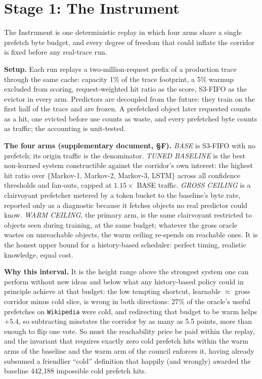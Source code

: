 \documentclass[letterpaper]{article} %
\begin{document}
\section{Stage 1: The Instrument}
The Instrument is one deterministic replay in which four arms share a single prefetch byte budget, and every degree of freedom that could inflate the corridor is fixed before any real-trace run.

\textbf{Setup.} Each run replays a two-million-request prefix of a production trace through the same cache: capacity 1\% of the trace footprint, a 5\% warmup excluded from scoring, request-weighted hit ratio as the score, S3-FIFO as the evictor in every arm. Predictors are decoupled from the future: they train on the first half of the trace and are frozen. A prefetched object later requested counts as a hit, one evicted before use counts as waste, and every prefetched byte counts as traffic; the accounting is unit-tested.

\textbf{The four arms (supplementary document, \S F).} \emph{BASE} is S3-FIFO with no prefetch; its origin traffic is the denominator. \emph{TUNED BASELINE} is the best non-learned system constructible against the corridor's own interest: the highest hit ratio over $\{$Markov-1, Markov-2, Markov-3, LSTM$\}$ across all confidence thresholds and fan-outs, capped at $1.15\times$ BASE traffic. \emph{GROSS CEILING} is a clairvoyant prefetcher metered by a token bucket to the baseline's byte rate, reported only as a diagnostic because it fetches objects no real predictor could know. \emph{WARM CEILING}, the primary arm, is the same clairvoyant restricted to objects seen during training, at the same budget; whatever the gross oracle wastes on unreachable objects, the warm ceiling re-spends on reachable ones. It is the honest upper bound for a history-based scheduler: perfect timing, realistic knowledge, equal cost.

\textbf{Why this interval.} It is the height range above the strongest system one can perform without new ideas and below what any history-based policy could in principle achieve at that budget: the low tempting shortcut, learnable $\approx$ gross corridor minus cold slice, is wrong in both directions: 27\% of the oracle's useful prefetches on \texttt{Wikipedia} were cold, and redirecting that budget to be warm helps $+5.4$, so subtracting misstates the corridor by as many as 5.5 points, more than enough to flip one vote. So must the reachability price be paid within the replay, and the invariant that requires exactly zero cold prefetch hits within the warm arms of the baseline and the warm arm of the council enforces it, having already subsumed a friendlier ``cold'' definition that happily (and wrongly) awarded the baseline 442{,}188 impossible cold prefetch hits.
\end{document}
